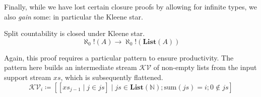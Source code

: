 Finally, while we have lost certain closure proofs by allowing for infinite
types, we also \emph{gain} some: in particular the Kleene star.
\begin{theorem}
  Split countability is closed under Kleene star.
  \begin{equation}
    \aleph_0!(A) \rightarrow \aleph_0!(\mathbf{List}(A))
  \end{equation}
\end{theorem}
Again, this proof requires a particular pattern to ensure productivity.
The pattern here builds an intermediate stream \(\mathcal{KV}\) of non-empty
lists from the input support stream \(\mathit{xs}\), which is subsequently
flattened.
\begin{equation}
  \mathcal{KV}_i \coloneqq \left[ \left[ \mathit{xs}_{j - 1} \mid j \in \mathit{js} \right] \mid \mathit{js} \in \mathbf{List}(\mathbb{N}) ; \text{sum}(\mathit{js}) = i ; 0 \notin \mathit{js}  \right]
\end{equation}

